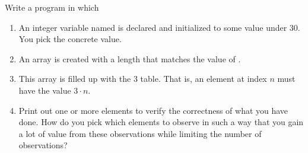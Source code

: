 Write a program in which
\begin{enumerate}
  \item An integer variable named  is declared and initialized to some value under 30. You pick the concrete value.
  \item An array is created with a length that matches the value of .
  \item This array is filled up with the 3 table. That is, an element at index $n$ must have the value $3 \cdot n$.
  \item Print out one or more elements to verify the correctness of what you have done. How do you pick which elements to observe in such a way that you gain a lot of value from these observations while limiting the number of observations?
\end{enumerate}

